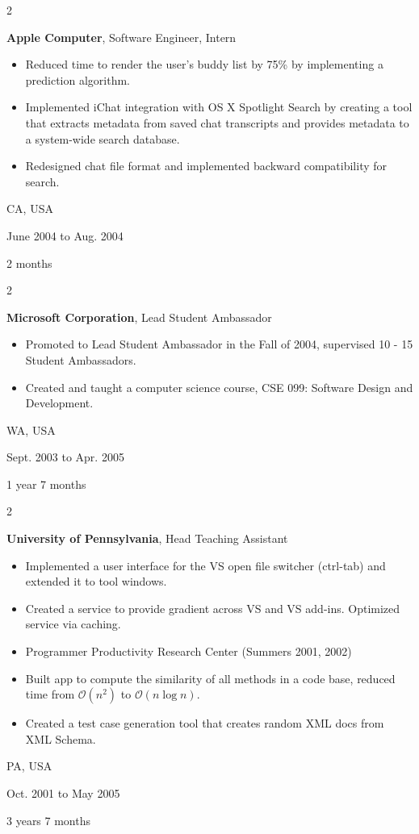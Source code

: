 \documentclass[10pt, letterpaper]{article}
\newenvironment{highlights}{
    \begin{itemize}[
        topsep=0.10 cm,
        parsep=0.10 cm,
        partopsep=0pt,
        itemsep=0pt,
        leftmargin=0.4 cm + 10pt
    ]
    }{
    \end{itemize}
} %
\newenvironment{twocolentry}[2][]{
    \onecolentry
    \def\secondColumn{#2}
    \setcolumnwidth{\fill, 4.5 cm}
    \begin{paracol}{2}
    }{
        \switchcolumn \raggedleft \secondColumn
    \end{paracol}
    \endonecolentry
} %
\begin{document}
    \begin{twocolentry}{
        CA, USA

        June 2004 to Aug. 2004

        2 months
    }
        \textbf{Apple Computer}, Software Engineer, Intern
        \begin{highlights}
            \item Reduced time to render the user's buddy list by 75\% by implementing a prediction algorithm.
            \item Implemented iChat integration with OS X Spotlight Search by creating a tool that extracts metadata from saved chat transcripts and provides metadata to a system-wide search database.
            \item Redesigned chat file format and implemented backward compatibility for search.
        \end{highlights}
    \end{twocolentry}


    \vspace{0.2 cm}

    \begin{twocolentry}{
        WA, USA

        Sept. 2003 to Apr. 2005

        1 year 7 months
    }
        \textbf{Microsoft Corporation}, Lead Student Ambassador
        \begin{highlights}
            \item Promoted to Lead Student Ambassador in the Fall of 2004, supervised 10 - 15 Student Ambassadors.
            \item Created and taught a computer science course, CSE 099: Software Design and Development.
        \end{highlights}
    \end{twocolentry}


    \vspace{0.2 cm}

    \begin{twocolentry}{
        PA, USA

        Oct. 2001 to May 2005

        3 years 7 months
    }
        \textbf{University of Pennsylvania}, Head Teaching Assistant
        \begin{highlights}
            \item Implemented a user interface for the VS open file switcher (ctrl-tab) and extended it to tool windows.
            \item Created a service to provide gradient across VS and VS add-ins. Optimized service via caching.
            \item Programmer Productivity Research Center (Summers 2001, 2002)
            \item Built app to compute the similarity of all methods in a code base, reduced time from $\mathcal{O}(n^2)$ to $\mathcal{O}(n \log n)$.
            \item Created a test case generation tool that creates random XML docs from XML Schema.
        \end{highlights}
    \end{twocolentry}
\end{document}

